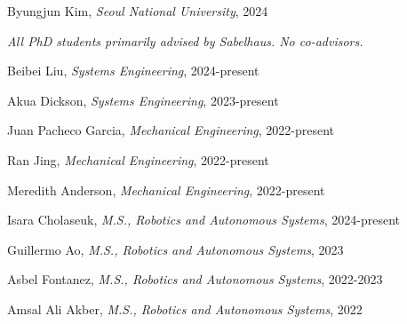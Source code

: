 \documentclass[letterpaper]{deedy-resume} %
\begin{document}
\begin{etaremune}[itemsep=0.05cm]

\item Byungjun Kim, {\it Seoul National University}, 2024

\end{etaremune}

{}

\vspace{0.2cm}

{\it All PhD students primarily advised by Sabelhaus. No co-advisors.}

\begin{etaremune}[itemsep=0.05cm]

\item Beibei Liu, {\it Systems Engineering}, 2024-present

\item Akua Dickson, {\it Systems Engineering}, 2023-present

\item Juan Pacheco Garcia, {\it Mechanical Engineering}, 2022-present

\item Ran Jing, {\it Mechanical Engineering}, 2022-present

\item Meredith Anderson, {\it Mechanical Engineering}, 2022-present

\end{etaremune}

{}

\begin{etaremune}[itemsep=0.05cm]

\item Isara Cholaseuk, {\it M.S., Robotics and Autonomous Systems}, 2024-present

\item Guillermo Ao, {\it M.S., Robotics and Autonomous Systems}, 2023

\item Asbel Fontanez, {\it M.S., Robotics and Autonomous Systems}, 2022-2023

\item Amsal Ali Akber, {\it M.S., Robotics and Autonomous Systems}, 2022

\end{etaremune}

{}
\end{document}
